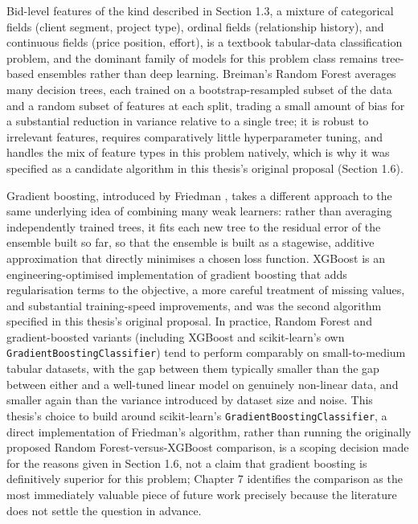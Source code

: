 Bid-level features of the kind described in Section 1.3, a mixture of
categorical fields (client segment, project type), ordinal fields
(relationship history), and continuous fields (price position, effort),
is a textbook tabular-data classification problem, and the dominant
family of models for this problem class remains tree-based ensembles
rather than deep learning. Breiman's Random Forest
\citep{breiman2001random} averages many decision trees, each trained on
a bootstrap-resampled subset of the data and a random subset of features
at each split, trading a small amount of bias for a substantial
reduction in variance relative to a single tree; it is robust to
irrelevant features, requires comparatively little hyperparameter
tuning, and handles the mix of feature types in this problem natively,
which is why it was specified as a candidate algorithm in this thesis's
original proposal (Section 1.6).

Gradient boosting, introduced by Friedman \citep{friedman2001greedy},
takes a different approach to the same underlying idea of combining many
weak learners: rather than averaging independently trained trees, it
fits each new tree to the residual error of the ensemble built so far,
so that the ensemble is built as a stagewise, additive approximation
that directly minimises a chosen loss function. XGBoost
\citep{chen2016xgboost} is an engineering-optimised implementation of
gradient boosting that adds regularisation terms to the objective, a
more careful treatment of missing values, and substantial training-speed
improvements, and was the second algorithm specified in this thesis's
original proposal. In practice, Random Forest and gradient-boosted
variants (including XGBoost and scikit-learn's own
\texttt{GradientBoostingClassifier}) tend to perform comparably on
small-to-medium tabular datasets, with the gap between them typically
smaller than the gap between either and a well-tuned linear model on
genuinely non-linear data, and smaller again than the variance
introduced by dataset size and noise. This thesis's choice to build
around scikit-learn's \texttt{GradientBoostingClassifier}, a direct
implementation of Friedman's \citeyearpar{friedman2001greedy} algorithm,
rather than running the originally proposed Random Forest-versus-XGBoost
comparison, is a scoping decision made for the reasons given in Section
1.6, not a claim that gradient boosting is definitively superior for
this problem; Chapter 7 identifies the comparison as the most
immediately valuable piece of future work precisely because the
literature does not settle the question in advance.

